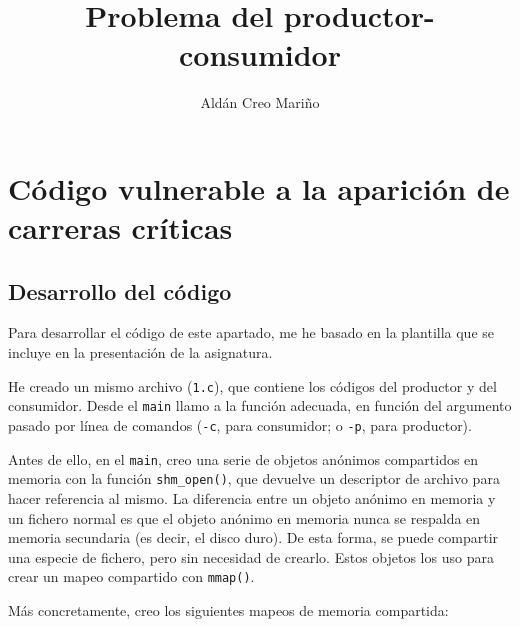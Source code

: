 \documentclass[a4paper]{article}
\title{Problema del productor-consumidor}
\author{Aldán Creo Mariño}
\begin{document}
\maketitle

\section{Código vulnerable a la aparición de carreras críticas}

\subsection{Desarrollo del código}

Para desarrollar el código de este apartado, me he basado en la plantilla que se incluye en la presentación de la asignatura.

He creado un mismo archivo (\texttt{1.c}), que contiene los códigos del productor y del consumidor. Desde el \texttt{main} llamo a la función adecuada, en función del argumento pasado por línea de comandos (\texttt{-c}, para consumidor; o \texttt{-p}, para productor).

Antes de ello, en el \texttt{main}, creo una serie de objetos anónimos compartidos en memoria con la función \texttt{shm\_open()}, que devuelve un descriptor de archivo para hacer referencia al mismo. La diferencia entre un objeto anónimo en memoria y un fichero normal es que el objeto anónimo en memoria nunca se respalda en memoria secundaria (es decir, el disco duro). De esta forma, se puede compartir una especie de fichero, pero sin necesidad de crearlo. Estos objetos los uso para crear un mapeo compartido con \texttt{mmap()}.

Más concretamente, creo los siguientes mapeos de memoria compartida:
\end{document}
